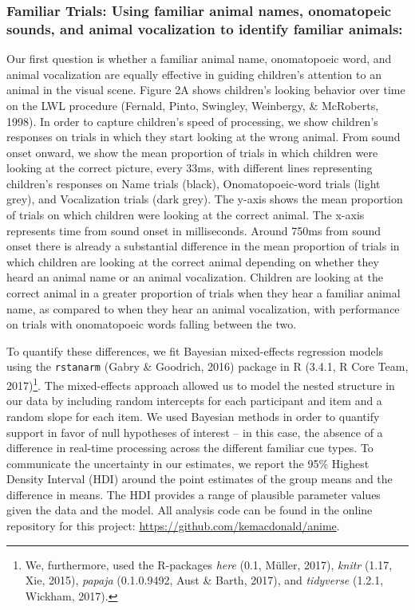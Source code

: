 \documentclass[english,floatsintext,man]{apa6}
\theoremstyle{definition}
\theoremstyle{definition}
\theoremstyle{definition}
\theoremstyle{remark}
\begin{document}
\subsubsection{Familiar Trials: Using familiar animal names, onomatopeic
sounds, and animal vocalization to identify familiar
animals:}\label{familiar-trials-using-familiar-animal-names-onomatopeic-sounds-and-animal-vocalization-to-identify-familiar-animals}

Our first question is whether a familiar animal name, onomatopoeic word,
and animal vocalization are equally effective in guiding children's
attention to an animal in the visual scene. Figure 2A shows children's
looking behavior over time on the LWL procedure (Fernald, Pinto,
Swingley, Weinbergy, \& McRoberts, 1998). In order to capture children's
speed of processing, we show children's responses on trials in which
they start looking at the wrong animal. From sound onset onward, we show
the mean proportion of trials in which children were looking at the
correct picture, every 33ms, with different lines representing
children's responses on Name trials (black), Onomatopoeic-word trials
(light grey), and Vocalization trials (dark grey). The y-axis shows the
mean proportion of trials on which children were looking at the correct
animal. The x-axis represents time from sound onset in milliseconds.
Around 750ms from sound onset there is already a substantial difference
in the mean proportion of trials in which children are looking at the
correct animal depending on whether they heard an animal name or an
animal vocalization. Children are looking at the correct animal in a
greater proportion of trials when they hear a familiar animal name, as
compared to when they hear an animal vocalization, with performance on
trials with onomatopoeic words falling between the two.

To quantify these differences, we fit Bayesian mixed-effects regression
models using the \texttt{rstanarm} (Gabry \& Goodrich, 2016) package in
R (3.4.1, R Core Team, 2017)\footnote{We, furthermore, used the
  R-packages \emph{here} (0.1, Müller, 2017), \emph{knitr} (1.17, Xie,
  2015), \emph{papaja} (0.1.0.9492, Aust \& Barth, 2017), and
  \emph{tidyverse} (1.2.1, Wickham, 2017).}. The mixed-effects approach
allowed us to model the nested structure in our data by including random
intercepts for each participant and item and a random slope for each
item. We used Bayesian methods in order to quantify support in favor of
null hypotheses of interest -- in this case, the absence of a difference
in real-time processing across the different familiar cue types. To
communicate the uncertainty in our estimates, we report the 95\% Highest
Density Interval (HDI) around the point estimates of the group means and
the difference in means. The HDI provides a range of plausible parameter
values given the data and the model. All analysis code can be found in
the online repository for this project:
\url{https://github.com/kemacdonald/anime}.
\end{document}
